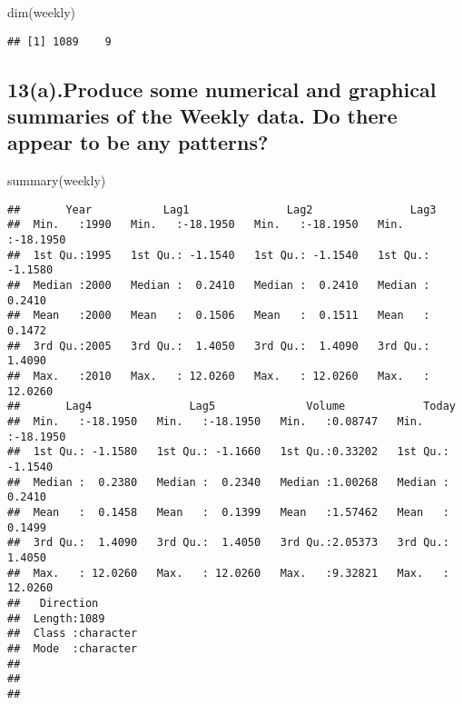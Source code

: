 \documentclass[
]{article}
\newenvironment{Shaded}{\begin{snugshade}}{\end{snugshade}}
\newcommand{\FunctionTok}[1]{\textcolor[rgb]{0.00,0.00,0.00}{#1}}
\newcommand{\NormalTok}[1]{#1}
\begin{document}
\begin{Shaded}
\begin{Highlighting}[]
\FunctionTok{dim}\NormalTok{(weekly)}
\end{Highlighting}
\end{Shaded}

\begin{verbatim}
## [1] 1089    9
\end{verbatim}

\hypertarget{a.produce-some-numerical-and-graphical-summaries-of-the-weekly-data.-do-there-appear-to-be-any-patterns}{%
\subsection{13(a).Produce some numerical and graphical summaries of the
Weekly data. Do there appear to be any
patterns?}\label{a.produce-some-numerical-and-graphical-summaries-of-the-weekly-data.-do-there-appear-to-be-any-patterns}}

\begin{Shaded}
\begin{Highlighting}[]
\FunctionTok{summary}\NormalTok{(weekly)}
\end{Highlighting}
\end{Shaded}

\begin{verbatim}
##       Year           Lag1               Lag2               Lag3         
##  Min.   :1990   Min.   :-18.1950   Min.   :-18.1950   Min.   :-18.1950  
##  1st Qu.:1995   1st Qu.: -1.1540   1st Qu.: -1.1540   1st Qu.: -1.1580  
##  Median :2000   Median :  0.2410   Median :  0.2410   Median :  0.2410  
##  Mean   :2000   Mean   :  0.1506   Mean   :  0.1511   Mean   :  0.1472  
##  3rd Qu.:2005   3rd Qu.:  1.4050   3rd Qu.:  1.4090   3rd Qu.:  1.4090  
##  Max.   :2010   Max.   : 12.0260   Max.   : 12.0260   Max.   : 12.0260  
##       Lag4               Lag5              Volume            Today         
##  Min.   :-18.1950   Min.   :-18.1950   Min.   :0.08747   Min.   :-18.1950  
##  1st Qu.: -1.1580   1st Qu.: -1.1660   1st Qu.:0.33202   1st Qu.: -1.1540  
##  Median :  0.2380   Median :  0.2340   Median :1.00268   Median :  0.2410  
##  Mean   :  0.1458   Mean   :  0.1399   Mean   :1.57462   Mean   :  0.1499  
##  3rd Qu.:  1.4090   3rd Qu.:  1.4050   3rd Qu.:2.05373   3rd Qu.:  1.4050  
##  Max.   : 12.0260   Max.   : 12.0260   Max.   :9.32821   Max.   : 12.0260  
##   Direction        
##  Length:1089       
##  Class :character  
##  Mode  :character  
##                    
##                    
## 
\end{verbatim}
\end{document}
